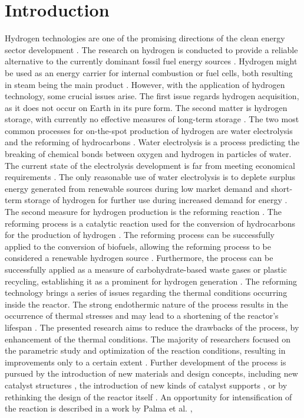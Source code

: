 \documentclass[preprint,12pt]{elsarticle}
\begin{document}

\section{Introduction}

Hydrogen technologies are one of the promising directions of the clean energy sector development \cite{Qazi2022}. The research on hydrogen is conducted to provide a reliable alternative to the currently dominant fossil fuel energy sources \cite{Zou2016, Liobikiene2021}. Hydrogen might be used as an energy carrier for internal combustion or fuel cells, both resulting in steam being the main product \cite{Xu2020, Shadidi2021}.
 However, with the application of hydrogen technology, some crucial issues arise. The first issue regards hydrogen acquisition, as it does not occur on Earth in its pure form. The second matter is hydrogen storage, with currently no effective measures of long-term storage \cite{Hassan2021, Tarhan2022}.  The two most common processes for on-the-spot production of hydrogen are water electrolysis and the reforming of hydrocarbons  \cite{Hassan2021RSER, Azizan2020}. Water electrolysis is a process predicting the breaking of chemical bonds between oxygen and hydrogen in particles of water. The current state of the electrolysis development is far from meeting economical requirements \cite{Yukesh2021}. The only reasonable use of water electrolysis is to deplete surplus energy generated from renewable sources during low market demand and short-term storage of hydrogen for further use during increased demand for energy \cite{Chi2018}. The second measure for hydrogen production is the reforming reaction \cite{Zhang2021, Nkulikiyinka2020}. The reforming process is a catalytic reaction used for the conversion of hydrocarbons for the production of hydrogen \cite{Taherian2022, Faheem2022}. The reforming process can be successfully applied to the conversion of biofuels, allowing the reforming process to be considered a renewable hydrogen source \cite{Zhao2020, Gao2022}. Furthermore, the process can be successfully applied as a measure of carbohydrate-based waste gases or plastic recycling, establishing it as a prominent for hydrogen generation \cite{Saad2016, Zhang2022}. The reforming technology brings a series of issues regarding the thermal conditions occurring inside the reactor. The strong endothermic nature of the process results in the occurrence of thermal stresses and may lead to a shortening of the reactor's lifespan \cite{Mozdzierz2014}. The presented research aims to reduce the drawbacks of the process, by enhancement of the thermal conditions. The majority of researchers focused on the parametric study and optimization of the reaction conditions, resulting in improvements only to a certain extent \cite{Simpson2007, Naseri2015}. Further development of the process is pursued by the introduction of new materials and design concepts, including new catalyst structures \cite{Ali2016, Kolaczkowski2016}, the introduction of new kinds of catalyst supports \cite{Yadav2019}, or by rethinking the design of the reactor itself \cite{Butcher2014, Cherif2019, Yun2019, Meloni2020}.  An opportunity for intensification of the reaction is described in a work by Palma et al. \cite{Palma2017}, 
\end{document}
